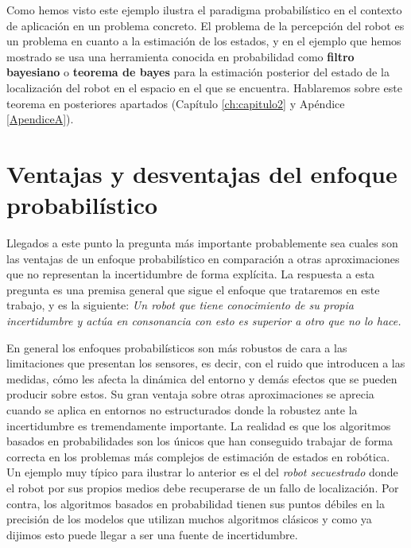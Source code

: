 Como hemos visto este ejemplo ilustra el paradigma probabilístico en el contexto de aplicación en un problema concreto. El problema de la percepción del robot es un problema en cuanto a la estimación de los estados, y en el ejemplo que hemos mostrado se usa una herramienta conocida en probabilidad como \textbf{filtro bayesiano} o \textbf{teorema de bayes} para la estimación posterior del estado de la localización del robot en el espacio en el que se encuentra. Hablaremos sobre este teorema en posteriores apartados (Capítulo \ref{ch:capitulo2}  y Apéndice \ref{ApendiceA}).
%
%
%
%
%
%
%
%

\section{Ventajas y desventajas del enfoque probabilístico}

Llegados a este punto la pregunta más importante probablemente sea cuales son las ventajas de un enfoque probabilístico en comparación a otras aproximaciones que no representan la incertidumbre de forma explícita. La respuesta a esta pregunta es una premisa general que sigue el enfoque que trataremos en este trabajo, y es la siguiente: \textit{Un robot que tiene conocimiento de su propia incertidumbre y actúa en consonancia con esto es superior a otro que no lo hace.}

En general los enfoques probabilísticos son más robustos de cara a las limitaciones que presentan los sensores, es decir, con el ruido que introducen a las medidas, cómo les afecta la dinámica del entorno y demás efectos que se pueden producir sobre estos. Su gran ventaja sobre otras aproximaciones se aprecia cuando se aplica en entornos no estructurados donde la robustez ante la incertidumbre  es tremendamente importante. La realidad es que los algoritmos basados en probabilidades son los únicos que han conseguido trabajar de forma correcta en los problemas más complejos de estimación de  estados en robótica. Un ejemplo muy típico para ilustrar lo anterior es el del \textit{robot secuestrado} donde el robot por sus propios medios debe recuperarse de un fallo de localización. Por contra, los algoritmos basados en probabilidad tienen sus puntos débiles en la precisión de los modelos que utilizan muchos algoritmos clásicos y como ya dijimos esto puede llegar a ser una fuente de incertidumbre.
%
%
%
%
%
%


